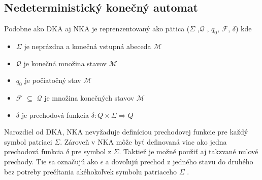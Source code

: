 \subsection{Nedeterministický konečný automat}
\noindent Podobne ako DKA aj NKA je reprenzentovaný ako  pätica ($\Sigma$ ,$\mathcal{Q}$ , $q_0$, $\mathcal{F}$, $\delta$) kde
\begin{itemize}
    \item $\Sigma$ je neprázdna a konečná vstupná abeceda $\mathcal{M}$
    \item $\mathcal{Q}$ je konečná množina stavov $\mathcal{M}$
    \item $q_0$ je počiatočný stav $\mathcal{M}$
    \item $\mathcal{F}$ $\subseteq$ $\mathcal{Q}$ je množina konečných stavov $\mathcal{M}$
    \item $\delta$ je prechodová funkcia  \begin{math}\delta : Q \times \Sigma \Rightarrow Q\end{math}
\end{itemize}

Narozdiel od DKA, NKA nevyžaduje definíciou prechodovej funkcie pre každý symbol 
patriaci $\Sigma$. Zároveň v NKA môže byť definovaná viac ako jedna prechodová funkcia $\delta$ pre symbol z $\Sigma$. 
Taktiež je možné použiť aj takzvané nulové prechody. 
Tie sa označujú ako $\epsilon$ a dovoľujú prechod z jedného stavu do druhého bez potreby prečítania akéhokoľvek symbolu patriaceho $\Sigma$ \cite{FiniteStateMachines}.